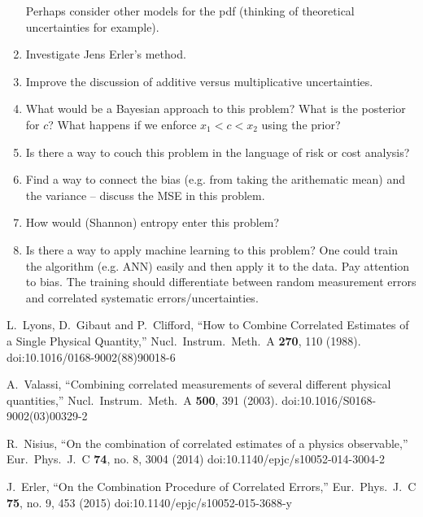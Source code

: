 \documentclass[11pt]{article}
\begin{document}
\begin{enumerate}
Perhaps consider other models for the pdf (thinking of theoretical uncertainties for example).
\item
Investigate Jens Erler's method.
\item
Improve the discussion of additive versus multiplicative uncertainties.
\item
What would be a Bayesian approach to this problem?
What is the posterior for $c$?   What happens if we enforce
$x_1 < c < x_2$ using the prior?
\item
Is there a way to couch this problem in the language of risk or cost analysis?
\item
Find a way to connect the bias (e.g. from taking the arithematic mean)
and the variance -- discuss the MSE in this problem.
\item
How would (Shannon) entropy enter this problem?
\item
Is there a way to apply machine learning to this problem?
One could train the algorithm (e.g. ANN) easily and then
apply it to the data.  Pay attention to bias.
The training should differentiate between random measurement
errors and correlated systematic errors/uncertainties.

\end{enumerate}





\begin{thebibliography}{9}

  L.~Lyons, D.~Gibaut and P.~Clifford,
  ``How to Combine Correlated Estimates of a Single Physical Quantity,''
  Nucl.\ Instrum.\ Meth.\ A {\bf 270}, 110 (1988).
  doi:10.1016/0168-9002(88)90018-6


  A.~Valassi,
  ``Combining correlated measurements of several different physical quantities,''
  Nucl.\ Instrum.\ Meth.\ A {\bf 500}, 391 (2003).
  doi:10.1016/S0168-9002(03)00329-2

  R.~Nisius,
  ``On the combination of correlated estimates of a physics observable,''
  Eur.\ Phys.\ J.\ C {\bf 74}, no. 8, 3004 (2014)
  doi:10.1140/epjc/s10052-014-3004-2


  J.~Erler,
  ``On the Combination Procedure of Correlated Errors,''
  Eur.\ Phys.\ J.\ C {\bf 75}, no. 9, 453 (2015)
  doi:10.1140/epjc/s10052-015-3688-y




\end{thebibliography}
\end{document}
